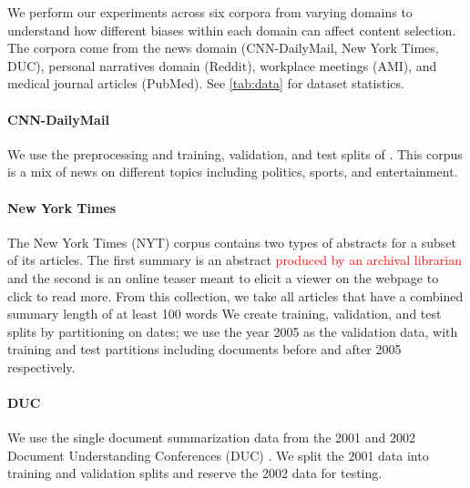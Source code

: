 We perform our experiments across six corpora from varying domains to 
understand how different biases within each domain can affect content 
selection. The corpora come from the news domain
(CNN-DailyMail, New York Times, DUC), personal narratives domain (Reddit),
workplace meetings (AMI), and medical journal articles (PubMed). See 
\autoref{tab:data} for dataset statistics.


\paragraph{CNN-DailyMail} We use the preprocessing and training, validation, 
and test splits
of \cite{see2017get}.
This corpus is a mix of news on different topics including politics,
sports, and entertainment.

\paragraph{New York Times}The New York Times (NYT) corpus \cite{sandhaus2008new} contains
 two types of abstracts for a subset of its articles. The first summary is
an abstract \textcolor{red}{produced by an archival librarian} and the 
second is an online teaser meant to elicit a viewer on the webpage to
click to read more. From this collection, we take all articles that have 
a combined summary length of at least 100 words
We create training, validation, and test splits by partitioning on dates;
we use the year 2005 as the validation data, with training and test partitions
including documents before and after 2005 respectively.

\paragraph{DUC} We use the single document summarization data from the 2001
and 2002
Document Understanding Conferences (DUC) \cite{over2002introduction}. We split the 2001 data into training
and validation splits and reserve the 2002 data for testing.

